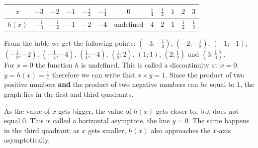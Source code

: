\begin{wex}
{{\begin{table}[H]
\begin{center}
\begin{tabular}{|c|c|c|c|c|c|c|c|c|c|c|c|}
\hline
  $x$ &  $-3$ & $-2$ & $-1$ & $-\frac{1}{2}$ & $-\frac{1}{4}$ &$0$&$\frac{1}{4}$&$\frac{1}{2}$&$1$&$2$&$3$
\\ \hline
 $h(x)$& $-\frac{1}{3}$ &$-\frac{1}{2}$&$-1$&$-2$&$-4$&undefined&$4$&$2$&$1$&$\frac{1}{2}$&$\frac{1}{3}$
\\ \hline
\end{tabular}
\end{center}
\end{table}
}
From the table we get the following points: $(-3; -\frac{1}{3})$, $(-2; -\frac{1}{2})$, $(-1;-1)$, $(-\frac{1}{2}; -2)$, $(-\frac{1}{4}; -4)$, $(\frac{1}{4}; -4)$, $(\frac{1}{2}; 2)$, $(1; 1)$, $(2; \frac{1}{2})$ and $(3; \frac{1}{3})$. \vspace{8pt} \\




For $x=0$ the function $h$ is undefined. This is called a discontinuity at $x=0$. \vspace{8pt} \\
$y=h(x) = \frac{1}{x}$ therefore we can write that $x \times y = 1$. Since the product of two positive numbers \textbf{and} the product of two negative numbers can be equal to $1$, the graph lies in the first and third quadrants.

As the value of $x$ gets bigger, the value of $h(x)$ gets closer to, but does not equal $0$. This is called a horizontal asymptote, the line $y=0$. The same happens in the third quadrant; as $x$ gets smaller, $h(x)$ also approaches the $x$-axis asymptotically.\vspace{8pt} \\

}
\end{wex}
